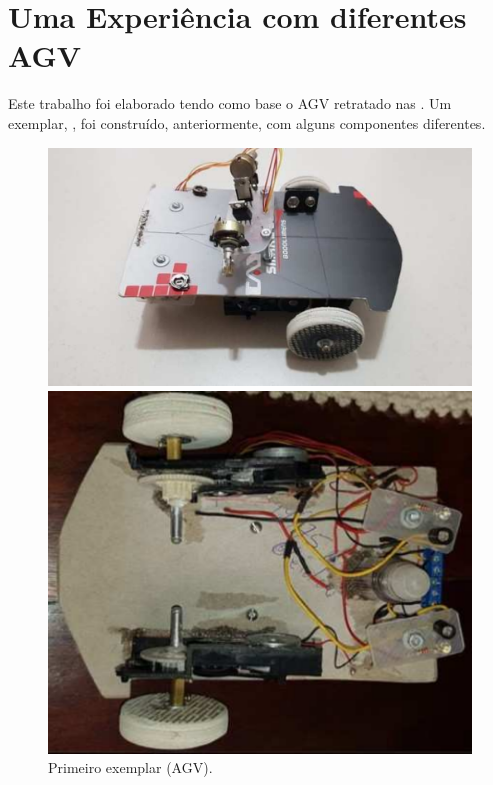 \documentclass{textolivre-html}
\begin{document}
\section{Uma Experiência com diferentes AGV}\label{sec-experiencia}

Este trabalho foi elaborado tendo como base o AGV retratado nas
. Um exemplar, , foi construído, anteriormente,
com alguns componentes diferentes.

\begin{figure}[h!]
\begin{minipage}{0.47\textwidth}
\includegraphics[width=\linewidth]{figure-36.pdf}
\subcaption{}
\end{minipage}
\hfill
\begin{minipage}{0.47\textwidth}
\includegraphics[width=\linewidth]{figure-37.pdf}
\subcaption{}
\end{minipage}
\caption{Primeiro exemplar (AGV).}
\label{fig26}
\end{figure}
\end{document}

